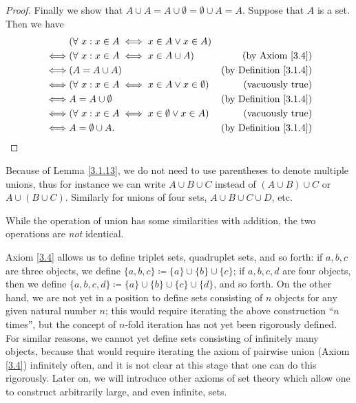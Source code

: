 \begin{proof}
Finally we show that \(A \cup A = A \cup \emptyset = \emptyset \cup A = A\).
Suppose that \(A\) is a set.
Then we have
\begin{align*}
& (\forall\ x : x \in A \iff x \in A \lor x \in A) \\
\iff & (\forall\ x : x \in A \iff x \in A \cup A) & \text{(by Axiom \ref{3.4})} \\
\iff & (A = A \cup A) & \text{(by Definition \ref{3.1.4})} \\
\iff & (\forall\ x : x \in A \iff x \in A \lor x \in \emptyset) & \text{(vacuously true)} \\
\iff & A = A \cup \emptyset & \text{(by Definition \ref{3.1.4})} \\
\iff & (\forall\ x : x \in A \iff x \in \emptyset \lor x \in A) & \text{(vacuously true)} \\
\iff & A = \emptyset \cup A. & \text{(by Definition \ref{3.1.4})}
\end{align*}
\end{proof}

\begin{note}
Because of Lemma \ref{3.1.13}, we do not need to use parentheses to denote multiple unions, thus for instance we can write \(A \cup B \cup C\) instead of \((A \cup B) \cup C\) or \(A \cup (B \cup C)\).
Similarly for unions of four sets, \(A \cup B \cup C \cup D\), etc.
\end{note}

\begin{remark}\label{3.1.14}
While the operation of union has some similarities with addition, the two operations are \emph{not} identical.
\end{remark}

\begin{note}
Axiom \ref{3.4} allows us to define triplet sets, quadruplet sets, and so forth: if \(a, b, c\) are three objects, we define \(\{a, b, c\} \coloneqq \{a\} \cup \{b\} \cup \{c\}\);
if \(a, b, c, d\) are four objects, then we define \(\{a, b, c, d\} \coloneqq \{a\} \cup \{b\} \cup \{c\} \cup \{d\}\), and so forth.
On the other hand, we are not yet in a position to define sets consisting of \(n\) objects for any given natural number \(n\);
this would require iterating the above construction ``\(n\) times'', but the concept of \(n\)-fold iteration has not yet been rigorously defined.
For similar reasons, we cannot yet define sets consisting of infinitely many objects, because that would require iterating the axiom of pairwise union (Axiom \ref{3.4}) infinitely often, and it is not clear at this stage that one can do this rigorously.
Later on, we will introduce other axioms of set theory which allow one to construct arbitrarily large, and even infinite, sets.
\end{note}

